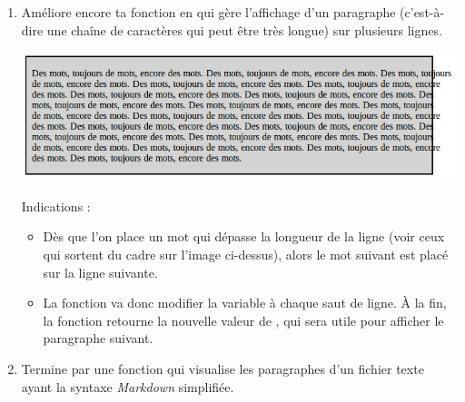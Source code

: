 \documentclass[11pt,class=report,crop=false]{standalone}
\begin{document}
\begin{activite}
\begin{enumerate}
   
  \item Améliore encore ta fonction en  qui gère l'affichage d'un paragraphe (c'est-à-dire une chaîne de caractères qui peut être très longue) sur plusieurs lignes.
  
\begin{center}
\includegraphics[scale=0.6]{ecran-markdown-6}
\end{center}   
 
   Indications :
  \begin{itemize}
    \item Dès que l'on place un mot qui dépasse la longueur de la ligne (voir ceux qui sortent du cadre sur l'image ci-dessus), alors le mot suivant est placé sur la ligne suivante.
    
    \item La fonction va donc modifier la variable  à chaque saut de ligne. À la fin, la fonction retourne la nouvelle valeur de , qui sera utile pour afficher le paragraphe suivant.
 
   \end{itemize}    
   
   \item Termine par une fonction  qui visualise les paragraphes d'un fichier texte ayant la syntaxe \emph{Markdown} simplifiée.
\end{enumerate} 
\end{activite}

\end{document}
